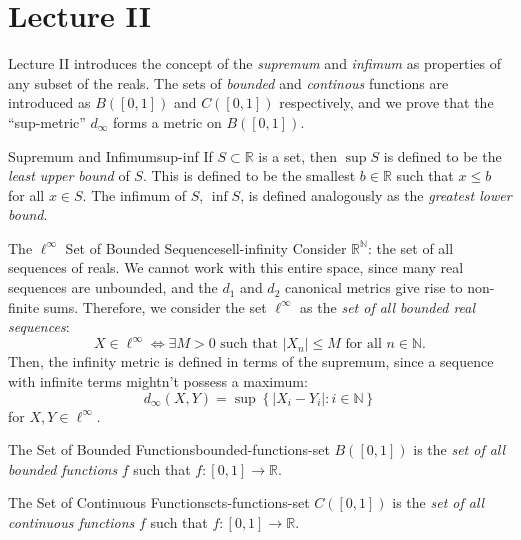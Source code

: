 \documentclass{article}
\numberwithin{equation}{section}
\numberwithin{enumi}{section}
\begin{document}
\section{Lecture II}

Lecture II introduces the concept of the \emph{supremum} and \emph{infimum} as
properties of any subset of the reals. The sets of \emph{bounded} and
\emph{continous} functions are introduced as $ B([0, 1]) $ and $ C([0, 1]) $
respectively, and we prove that the ``sup-metric'' $ d_\infty $ forms a metric
on $ B([0, 1]) $.
\begin{definition}{Supremum and Infimum}{sup-inf}
    If $ S \subset \mathbb{R} $ is a set, then $ \sup S $ is defined to be the
    \emph{least upper bound} of $ S $. This is defined to be the smallest $ b
    \in \mathbb{R} $ such that $ x \leq b $ for all $ x \in S $. The infimum of
    $ S $, $ \inf S $, is defined analogously as the \emph{greatest lower
    bound}.
\end{definition}
\begin{definition}{The \texorpdfstring{$ \ell^\infty $}{Ell-Infinity}
        Set of Bounded Sequences}{ell-infinity}
    Consider $ \mathbb{R}^\mathbb{N} $: the set of all sequences of reals. We
    cannot work with this entire space, since many real sequences are unbounded,
    and the $ d_1 $ and $ d_2 $ canonical metrics give rise to non-finite sums.
    Therefore, we consider the set $ \ell^\infty $ as the \emph{set of
    all bounded real sequences}:
    \begin{equation}
        X \in \ell^\infty \iff \exists M > 0 \text{ such that }
            \vert X_n \vert \leq M \text { for all } n \in \mathbb{N}.
    \end{equation}
    Then, the infinity metric is defined in terms of the supremum, since a
    sequence with infinite terms mightn't possess a maximum:
    \begin{equation}
        d_\infty(X, Y) = \sup\left\{\vert X_i - Y_i \vert \colon
            i \in \mathbb{N}\right\}
    \end{equation}
    for $ X, Y \in \ell^\infty $.
\end{definition}
\begin{definition}{The Set of Bounded Functions}{bounded-functions-set}
    $ B([0,1]) $ is the \emph{set of all bounded functions} $ f $ such that
    $ f \colon [0, 1] \to \mathbb{R} $.
\end{definition}
\begin{definition}{The Set of Continuous Functions}{cts-functions-set}
    $ C([0,1]) $ is the \emph{set of all continuous functions} $ f $ such that
    $ f \colon [0, 1] \to \mathbb{R} $.
\end{definition}
\end{document}
